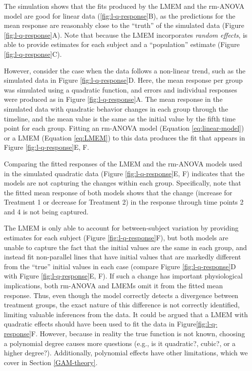 \documentclass[
]{article}
\begin{document}
The simulation shows that the fits produced by the LMEM and the rm-ANOVA model are good for linear data (\ref{fig:l-q-response}B), as the predictions for the mean response are reasonably close to the ``truth'' of the simulated data (Figure \ref{fig:l-q-response}A). Note that because the LMEM incorporates \emph{random effects}, is able to provide estimates for each subject and a ``population'' estimate (Figure \ref{fig:l-q-response}C).

However, consider the case when the data follows a non-linear trend, such as the simulated data in Figure \ref{fig:l-q-response}D. Here, the mean response per group was simulated using a quadratic function, and errors and individual responses were produced as in Figure \ref{fig:l-q-response}A. The mean response in the simulated data with quadratic behavior changes in each group through the timeline, and the mean value is the same as the initial value by the fifth time point for each group. Fitting an rm-ANOVA model (Equation \eqref{eq:linear-model}) or a LMEM (Equation \eqref{eq:LMEM}) to this data produces the fit that appears in Figure \ref{fig:l-q-response}E, F.

Comparing the fitted responses of the LMEM and the rm-ANOVA models used in the simulated quadratic data (Figure \ref{fig:l-q-response}E, F) indicates that the models are not capturing the changes within each group. Specifically, note that the fitted mean response of both models shows that the change (increase for Treatment 1 or decrease for Treatment 2) in the response through time points 2 and 4 is not being captured.

The LMEM is only able to account for between-subject variation by providing estimates for each subject (Figure \ref{fig:l-q-response}F), but both models are unable to capture the fact that the initial values are the same in each group, and instead fit non-parallel lines that have initial values that are markedly different from the ``true'' initial values in each case (compare Figure \ref{fig:l-q-response}D with Figure \ref{fig:l-q-response}E, F). If such a change has important physiological implications, both rm-ANOVA and LMEMs omit it from the fitted mean response. Thus, even though the model correctly detects a divergence between treatment groups, the exact nature of this difference is not correctly identified, limiting valuable inferences from the data. It could be argued that a LMEM with quadratic effects should have been used to fit the data in Figure\ref{fig:l-q-response}F. However, because in reality the true function is not known, choosing a polynomial degree causes more questions (e.g., is it quadratic?, cubic?, or a higher degree?). Additionally, polynomial effects have other limitations, which we cover in Section \ref{GAM-theory}.
\end{document}
